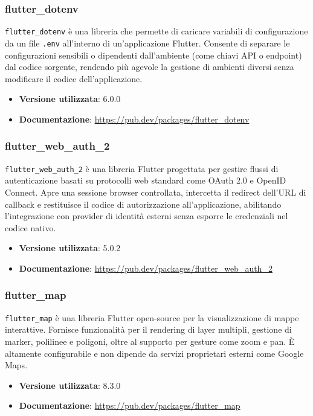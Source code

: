 \documentclass[a4paper,12pt]{article}
\begin{document}
\subsubsection{flutter\_dotenv}
\texttt{flutter\_dotenv} è una libreria che permette di caricare variabili di configurazione da un file \texttt{.env} all'interno di un'applicazione Flutter. Consente di separare le configurazioni sensibili o dipendenti dall'ambiente (come chiavi API o endpoint) dal codice sorgente, rendendo più agevole la gestione di ambienti diversi senza modificare il codice dell'applicazione.
\begin{itemize}
    \item \textbf{Versione utilizzata}: 6.0.0
    \item \textbf{Documentazione}: \url{https://pub.dev/packages/flutter_dotenv}
\end{itemize}

\subsubsection{flutter\_web\_auth\_2}
\texttt{flutter\_web\_auth\_2} è una libreria Flutter progettata per gestire flussi di autenticazione basati su protocolli web standard come OAuth 2.0 e OpenID Connect. Apre una sessione browser controllata, intercetta il redirect dell'URL di callback e restituisce il codice di autorizzazione all'applicazione, abilitando l'integrazione con provider di identità esterni senza esporre le credenziali nel codice nativo.
\begin{itemize}
    \item \textbf{Versione utilizzata}: 5.0.2
    \item \textbf{Documentazione}: \url{https://pub.dev/packages/flutter_web_auth_2}
\end{itemize}

\subsubsection{flutter\_map}
\texttt{flutter\_map} è una libreria Flutter open-source per la visualizzazione di mappe interattive. Fornisce funzionalità per il rendering di layer multipli, gestione di marker, polilinee e poligoni, oltre al supporto per gesture come zoom e pan. È altamente configurabile e non dipende da servizi proprietari esterni come Google Maps.
\begin{itemize}
    \item \textbf{Versione utilizzata}: 8.3.0
    \item \textbf{Documentazione}: \url{https://pub.dev/packages/flutter_map}
\end{itemize}
\end{document}
